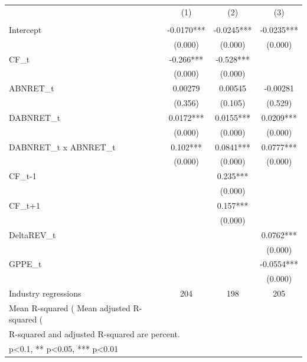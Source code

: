 {
\def\sym#1{\ifmmode^{#1}\else\(^{#1}\)\fi}
\begin{tabular}{l*{3}{c}}
\hline\hline
                    &\multicolumn{1}{c}{(1)}&\multicolumn{1}{c}{(2)}&\multicolumn{1}{c}{(3)}\\
                    &\multicolumn{1}{c}{}&\multicolumn{1}{c}{}&\multicolumn{1}{c}{}\\
\hline
Intercept           &     -0.0170***&     -0.0245***&     -0.0235***\\
                    &     (0.000)   &     (0.000)   &     (0.000)   \\
[1em]
CF\_t                &      -0.266***&      -0.528***&               \\
                    &     (0.000)   &     (0.000)   &               \\
[1em]
ABNRET\_t            &     0.00279   &     0.00545   &    -0.00281   \\
                    &     (0.356)   &     (0.105)   &     (0.529)   \\
[1em]
DABNRET\_t           &      0.0172***&      0.0155***&      0.0209***\\
                    &     (0.000)   &     (0.000)   &     (0.000)   \\
[1em]
DABNRET\_t x ABNRET\_t&       0.102***&      0.0841***&      0.0777***\\
                    &     (0.000)   &     (0.000)   &     (0.000)   \\
[1em]
CF\_{t-1}            &               &       0.235***&               \\
                    &               &     (0.000)   &               \\
[1em]
CF\_{t+1}            &               &       0.157***&               \\
                    &               &     (0.000)   &               \\
[1em]
DeltaREV\_t          &               &               &      0.0762***\\
                    &               &               &     (0.000)   \\
[1em]
GPPE\_t              &               &               &     -0.0554***\\
                    &               &               &     (0.000)   \\
\hline
Industry regressions&         204   &         198   &         205   \\
Mean R-squared (%
Mean adjusted R-squared (%
\hline\hline
\multicolumn{4}{l}{\footnotesize mean coefficients; p in parentheses}\\
\multicolumn{4}{l}{\footnotesize R-squared and adjusted R-squared are percent.}\\
\multicolumn{4}{l}{\footnotesize * p<0.1, ** p<0.05, *** p<0.01}\\
\end{tabular}
}
